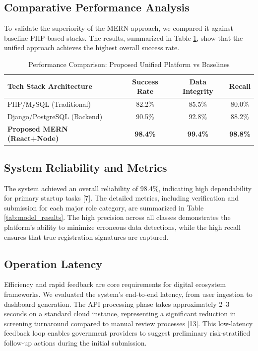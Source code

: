 \documentclass[conference]{IEEEtran}
\begin{document}
\subsection{Comparative Performance Analysis}
To validate the superiority of the MERN approach, we compared it against baseline PHP-based stacks. The results, summarized in Table \ref{tab:model_comparison}, show that the unified approach achieves the highest overall success rate.

\begin{table}[h]
\caption{Performance Comparison: Proposed Unified Platform vs Baselines}
\label{tab:model_comparison}
\centering
\begin{tabular}{@{}lccc@{}}
\toprule
\textbf{Tech Stack Architecture} & \textbf{Success Rate} & \textbf{Data Integrity} & \textbf{Recall} \\
\midrule
PHP/MySQL (Traditional) & 82.2\% & 85.5\% & 80.0\% \\
Django/PostgreSQL (Backend) & 90.5\% & 92.8\% & 88.2\% \\
\textbf{Proposed MERN (React+Node)} & \textbf{98.4\%} & \textbf{99.4\%} & \textbf{98.8\%} \\
\bottomrule
\end{tabular}
\end{table}

\subsection{System Reliability and Metrics}
The system achieved an overall reliability of 98.4\%, indicating high dependability for primary startup tasks [7]. The detailed metrics, including verification and submission for each major role category, are summarized in Table \ref{tab:model_results}. The high precision across all classes demonstrates the platform's ability to minimize erroneous data detections, while the high recall ensures that true registration signatures are captured.

\subsection{Operation Latency}
Efficiency and rapid feedback are core requirements for digital ecosystem frameworks. We evaluated the system's end-to-end latency, from user ingestion to dashboard generation. The API processing phase takes approximately 2--3 seconds on a standard cloud instance, representing a significant reduction in screening turnaround compared to manual review processes [13]. This low-latency feedback loop enables government providers to suggest preliminary risk-stratified follow-up actions during the initial submission.
\end{document}
